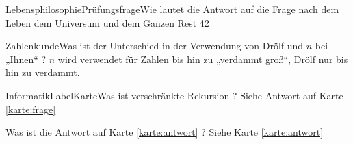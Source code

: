 \documentclass[print]{kartei}
\begin{document}
	
	\begin{karte}{Lebensphilosophie}{Prüfungsfrage}{Wie lautet die Antwort auf die Frage nach dem Leben dem Universum und dem Ganzen Rest}
	42
	\end{karte}
	
	\begin{karte}{Zahlenkunde}{}{Was ist der Unterschied in der Verwendung von Drölf und $n$ bei „Ihnen“ ?}
	$n$ wird verwendet für Zahlen bis hin zu „verdammt groß“, Drölf nur bis hin zu verdammt.
	\end{karte}

	\begin{karte}{Informatik}{LabelKarte}{Was ist verschränkte Rekursion ?}
	\label{karte:antwort} Siehe Antwort auf Karte \ref{karte:frage}
	\end{karte}

	\begin{karte}{}{}{Was ist die Antwort auf Karte \ref{karte:antwort} ?}
		\label{karte:frage} Siehe Karte \ref{karte:antwort}
	\end{karte}
\end{document}
